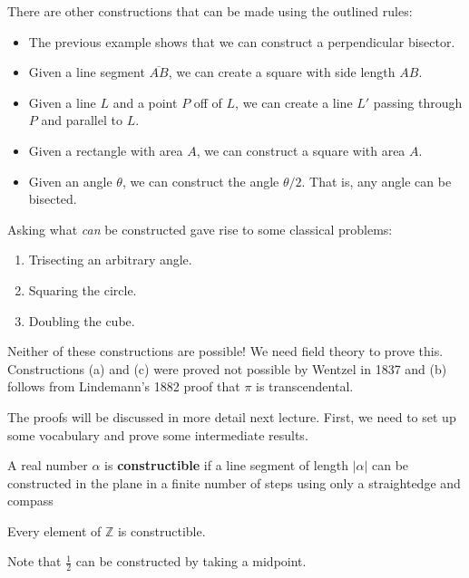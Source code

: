 \begin{example}
	There are other constructions that can be made using the outlined rules:
	\begin{itemize}
		\item The previous example shows that we can construct a perpendicular bisector.
		\item Given a line segment $\overline{AB}$, we can create a square with side length $AB$.
		\item Given a line $L$ and a point $P$ off of $L$, we can create a line $L'$ passing through $P$ and parallel to $L$.
		\item Given a rectangle with area $A$, we can construct a square with area $A$.
		\item Given an angle $\theta$, we can construct the angle $\theta/2$. That is, any angle can be bisected.
	\end{itemize}
\end{example}

Asking what \textit{can} be constructed gave rise to some classical problems:
\begin{rmkbox}
	\begin{enumerate}
		\item Trisecting an arbitrary angle.
		\item Squaring the circle.
		\item Doubling the cube.
	\end{enumerate}
\end{rmkbox}

Neither of these constructions are possible! We need field theory to prove this. Constructions (a) and (c) were proved not possible by Wentzel in 1837 and (b) follows from Lindemann's 1882 proof that $\pi$ is transcendental.

The proofs will be discussed in more detail next lecture. First, we need to set up some vocabulary and prove some intermediate results.

\begin{definition}
	A real number $\alpha$ is \textbf{constructible} if a line segment of length $|\alpha|$ can be constructed in the plane in a finite number of steps using only a straightedge and compass
\end{definition}

\begin{example}
	Every element of $\mathbb Z$ is constructible.

	\begin{center}
	\end{center}

	Note that $\frac 12$ can be constructed by taking a midpoint.
\end{example}

